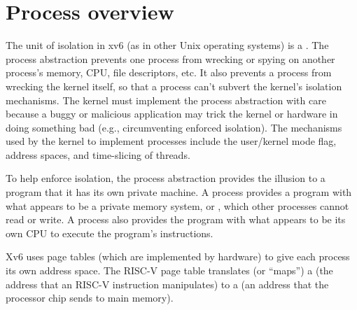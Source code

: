 \section{Process overview}

The unit of isolation in xv6 (as in other Unix operating systems) is a 
.
The process abstraction prevents one process from wrecking or spying on
another process's memory, CPU, file descriptors, etc.  It also prevents a process
from wrecking the kernel itself, so that a process can't subvert the kernel's
isolation mechanisms.
The kernel must implement the process abstraction with care because
a buggy or malicious application may trick the kernel or hardware in doing
something bad (e.g., circumventing enforced isolation).  The mechanisms used by
the kernel to implement processes include the user/kernel mode flag, address spaces,
and time-slicing of threads.

To help enforce isolation, the process abstraction provides the
illusion to a program that it has its own private machine.  A process provides
a program with what appears to be a private memory system, or
, 
which other processes cannot read or write.
A process also provides the program with what appears to be its own
CPU to execute the program's instructions.

Xv6 uses page tables (which are implemented by hardware) to give each process
its own address space. The RISC-V page table
translates (or ``maps'') a
(the address that an RISC-V instruction manipulates) to a
(an address that the processor chip sends to main memory).

